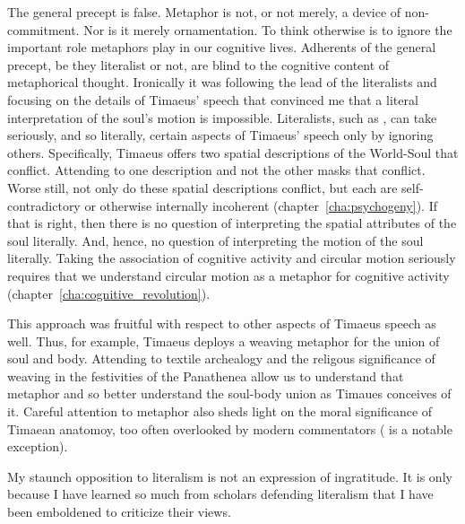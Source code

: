 The general precept is false. Metaphor is not, or not merely, a device of non-commit\-ment. Nor is it merely ornamentation. To think otherwise is to ignore the important role metaphors play in our cognitive lives. Adherents of the general precept, be they literalist or not, are blind to the cognitive content of metaphorical thought. Ironically it was following the lead of the literalists and focusing on the details of Timaeus' speech that convinced me that a literal interpretation of the soul's motion is impossible. Literalists, such as \citet{Sedley:1997kr}, can take seriously, and so literally, certain aspects of Timaeus' speech only by ignoring others. Specifically, Timaeus offers two spatial descriptions of the World-Soul that conflict. Attending to one description and not the other masks that conflict. Worse still, not only do these spatial descriptions conflict, but each are self-contradictory or otherwise internally incoherent (chapter~\ref{cha:psychogeny}). If that is right, then there is no question of interpreting the spatial attributes of the soul literally. And, hence, no question of interpreting the motion of the soul literally. Taking the association of cognitive activity and circular motion seriously requires that we understand circular motion as a metaphor for cognitive activity (chapter~\ref{cha:cognitive_revolution}). 

This approach was fruitful with respect to other aspects of Timaeus speech as well. Thus, for example, Timaeus deploys a weaving metaphor for the union of soul and body. Attending to textile archealogy and the religous significance of weaving in the festivities of the Panathenea allow us to understand that metaphor and so better understand the soul-body union as Timaues conceives of it. Careful attention to metaphor also sheds light on the moral significance of Timaean anatomoy, too often overlooked by modern commentators (\citealt{Steel:2001ay} is a notable exception).

My staunch opposition to literalism is not an expression of ingratitude. It is only because I have learned so much from scholars defending literalism that I have been emboldened to criticize their views.



